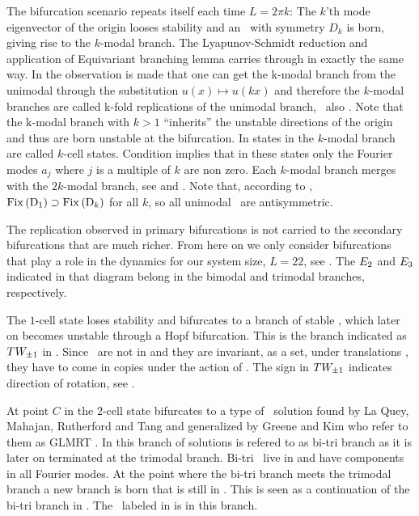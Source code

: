 The bifurcation scenario repeats itself each time $L=2\pi k$: The $k$'th mode eigenvector of
the origin looses stability and an \eqv\ with symmetry $D_k$ is born, giving rise to
the $k$-modal branch. The Lyapunov-Schmidt reduction and application of Equivariant branching lemma
carries through in exactly the same way. In  the observation is made that one
can get the k-modal branch from the unimodal through the substitution $u(x)\mapsto u(kx)$
and therefore the $k$-modal branches are called k-fold replications
of the unimodal branch, \cf\ also . Note that the k-modal branch
with $k>1$ ``inherits'' the unstable directions of the origin and thus are born unstable at the
bifurcation. In  states in the $k$-modal branch are called $k$-cell states.
Condition  implies that in these states only the Fourier modes $a_j$ where $j$
is a multiple of $k$ are non zero. Each $k$-modal branch merges with the $2k$-modal branch, see 
and . Note that, according to , $\mathrm{Fix}\left(\mathrm{D}_{1}\right)\supset\mathrm{Fix}\left(\mathrm{D}_{k}\right)$
for all $k$, so all unimodal \eqva\ are antisymmetric.

The replication observed in primary bifurcations is not carried to the secondary bifurcations that are
much richer. From here on we only consider bifurcations that play a role in the dynamics for our system size, $L=22$, see . The $E_{2}$ and $E_{3}$ indicated in that diagram belong
in the bimodal and trimodal branches, respectively.

The $1$-cell state loses stability and bifurcates to a branch of stable
\reqva, which later on becomes unstable through a Hopf bifurcation.
This is the branch indicated as $TW_{\pm1}$ in . Since \reqva\ are not in 
and they are invariant, as a set, under translations , they have to come in copies
under the action of . The sign in $TW_{\pm1}$ indicates direction of rotation, see .

At point $C$ in  the $2$-cell state
bifurcates to a type of \eqv\ solution found by La Quey,
Mahajan, Rutherford and Tang and generalized by
Greene and Kim who refer to them as GLMRT \eqva. In
 this branch of solutions is refered to as
bi-tri branch as it is later on terminated at the trimodal
branch. Bi-tri \eqva\ live in  and have components
in all Fourier modes. At the point where the bi-tri branch meets the
trimodal branch a new branch is born that is still in
. This is seen as a continuation of the bi-tri
branch in . The \eqv\ labeled  in
 is in this branch.

